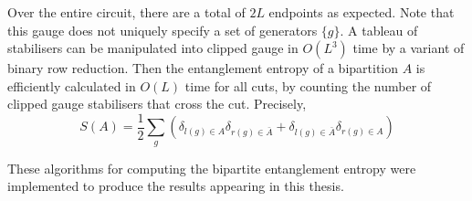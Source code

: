 \documentclass[10pt]{article}
\begin{document}
\begin{appendices}
Over the entire circuit, there are a total of $2L$ endpoints as expected. Note that this gauge does not uniquely specify a set of generators $\{g\}$. A tableau of stabilisers can be manipulated into clipped gauge in $O(L^3)$ time by a variant of binary row reduction. Then the entanglement entropy of a bipartition $A$ is efficiently calculated in $O(L)$ time for all cuts, by counting the number of clipped gauge stabilisers that cross the cut. Precisely,
\begin{equation}
S(A) = \frac{1}{2} \sum_g \left(\delta_{l(g) \in A} \delta_{r(g) \in \bar{A}} + \delta_{l(g) \in \bar{A}} \delta_{r(g) \in A}\right)
\end{equation}

These algorithms for computing the bipartite entanglement entropy were implemented to produce the results appearing in this thesis.

\end{appendices}

\newpage
\nocite{*}
\small
{}


\end{document}
